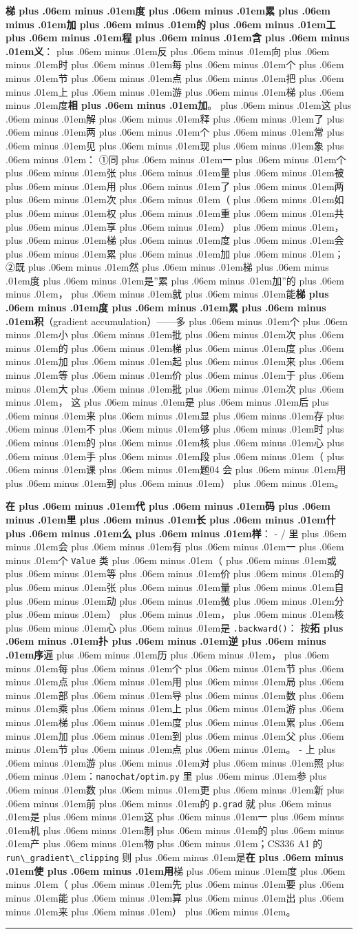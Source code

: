 \documentclass[
]{article}
\newcommand{\passthrough}[1]{#1}
\def\zh#1{{\zhfont #1}}
\def\sym#1{{\symfont #1}}
\def\codezh#1{{\zhmonofont #1}}
\def\zhglue{\hskip0pt plus .06em minus .01em}
\begin{document}
\textbf{\zh{梯\zhglue 度\zhglue 累\zhglue 加\zhglue 的\zhglue 工\zhglue 程\zhglue 含\zhglue 义}}\zh{：\zhglue 反\zhglue 向\zhglue 时\zhglue 每\zhglue 个\zhglue 节\zhglue 点\zhglue 把\zhglue 上\zhglue 游\zhglue 梯\zhglue 度}\textbf{\zh{相\zhglue 加}}\zh{。\zhglue 这\zhglue 解\zhglue 释\zhglue 了\zhglue 两\zhglue 个\zhglue 常\zhglue 见\zhglue 现\zhglue 象\zhglue ：} \sym{①}\zh{同\zhglue 一\zhglue 个\zhglue 张\zhglue 量\zhglue 被\zhglue 用\zhglue 了\zhglue 两\zhglue 次\zhglue （\zhglue 如\zhglue 权\zhglue 重\zhglue 共\zhglue 享\zhglue ）\zhglue ，\zhglue 梯\zhglue 度\zhglue 会\zhglue 累\zhglue 加\zhglue ；} \sym{②}\zh{既\zhglue 然\zhglue 梯\zhglue 度\zhglue 是}''\zh{累\zhglue 加}''\zh{的\zhglue ，\zhglue 就\zhglue 能}\textbf{\zh{梯\zhglue 度\zhglue 累\zhglue 积}}\zh{（}gradient accumulation\zh{）}------\zh{多\zhglue 个\zhglue 小\zhglue 批\zhglue 次\zhglue 的\zhglue 梯\zhglue 度\zhglue 加\zhglue 起\zhglue 来\zhglue 等\zhglue 价\zhglue 于\zhglue 大\zhglue 批\zhglue 次\zhglue ，} \zh{这\zhglue 是\zhglue 后\zhglue 来\zhglue 显\zhglue 存\zhglue 不\zhglue 够\zhglue 时\zhglue 的\zhglue 核\zhglue 心\zhglue 手\zhglue 段\zhglue （\zhglue 课\zhglue 题}04 \zh{会\zhglue 用\zhglue 到\zhglue ）\zhglue 。}

\textbf{\zh{在\zhglue 代\zhglue 码\zhglue 里\zhglue 长\zhglue 什\zhglue 么\zhglue 样}}\zh{：} - \passthrough{\codezh{{\zh{手}}{\zh{写}}/}} \zh{里\zhglue 会\zhglue 有\zhglue 一\zhglue 个} \passthrough{\lstinline!Value!} \zh{类\zhglue （\zhglue 或\zhglue 等\zhglue 价\zhglue 的\zhglue 张\zhglue 量\zhglue 自\zhglue 动\zhglue 微\zhglue 分\zhglue ）\zhglue ，\zhglue 核\zhglue 心\zhglue 是} \passthrough{\lstinline!.backward()!}\zh{：} \zh{按}\textbf{\zh{拓\zhglue 扑\zhglue 逆\zhglue 序}}\zh{遍\zhglue 历\zhglue ，\zhglue 每\zhglue 个\zhglue 节\zhglue 点\zhglue 用\zhglue 局\zhglue 部\zhglue 导\zhglue 数\zhglue 乘\zhglue 上\zhglue 游\zhglue 梯\zhglue 度\zhglue 累\zhglue 加\zhglue 到\zhglue 父\zhglue 节\zhglue 点\zhglue 。} - \zh{上\zhglue 游\zhglue 对\zhglue 照\zhglue ：}\passthrough{\lstinline!nanochat/optim.py!} \zh{里\zhglue 参\zhglue 数\zhglue 更\zhglue 新\zhglue 前\zhglue 的} \passthrough{\lstinline!p.grad!} \zh{就\zhglue 是\zhglue 这\zhglue 一\zhglue 机\zhglue 制\zhglue 的\zhglue 产\zhglue 物\zhglue ；}CS336 A1 \zh{的} \passthrough{\lstinline!run\_gradient\_clipping!} \zh{则\zhglue 是}\textbf{\zh{在\zhglue 使\zhglue 用}}\zh{梯\zhglue 度\zhglue （\zhglue 先\zhglue 要\zhglue 能\zhglue 算\zhglue 出\zhglue 来\zhglue ）\zhglue 。}

\begin{center}\rule{0.5\linewidth}{0.5pt}\end{center}
\end{document}
